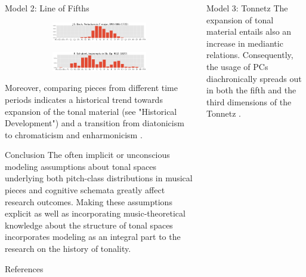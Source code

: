 \documentclass[final,cmyk]{beamer}
\begin{document}
\begin{frame}[t]
\begin{minipage}[t][.68\textheight][t]{\textwidth}
\begin{columns}[t]
\begin{column}{0.3\textwidth}
\begin{block}{Model 2: Line of Fifths}
\begin{figure}
				\begin{subfigure}{\textwidth} %
					\includegraphics[width=\textwidth]{img/gmm_bach.png}
				\end{subfigure}

				\begin{subfigure}{\textwidth} %
					\includegraphics[width=\textwidth]{img/gmm_schubert.png}
				\end{subfigure}
			\end{figure}

			Moreover, comparing pieces from different time periods indicates a historical trend towards expansion of the tonal material (see "Historical Development") and a transition from diatonicism to chromaticism and enharmonicism \autocite{Gardonyi2002}.
      \end{block}

			\begin{block}{Conclusion}
        The often implicit or unconscious \alert{modeling assumptions about tonal spaces}
        underlying both pitch-class distributions in musical pieces and cognitive schemata
        greatly affect research outcomes. Making these assumptions explicit
        as well as incorporating music-theoretical knowledge about the
        structure of tonal spaces incorporates modeling as an integral part
        to the research on the history of tonality.
      \end{block}

			\begin{block}{References}
          \printbibliography
      \end{block}


    \end{column}

    \begin{column}{0.3\textwidth}

			\begin{block}{Model 3: Tonnetz}
				The expansion of tonal material entails also an increase in mediantic relations.
				Consequently, the usage of PCs diachronically spreads out in both the fifth
				and the third dimensions of the Tonnetz \autocite{Cohn2012}.


\end{block}
\end{column}
\end{columns}
\end{minipage}
\end{frame}
\end{document}

